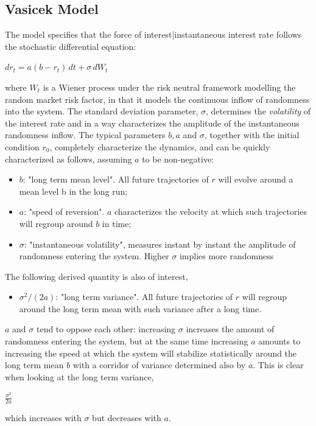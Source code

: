 \subsection{Vasicek Model}
The model specifies that the force of interest|instantaneous interest rate follows 
the stochastic differential equation:

$dr_t = a(b-r_t)\, dt + \sigma \, dW_t$

where $W_{t}$ is a Wiener process under the risk neutral framework modelling the random market risk factor,
 in that it models the continuous inflow of randomness into the system. The standard deviation parameter, $\sigma$, 
determines the \textit{volatility} of the interest rate and in a way characterizes the amplitude of the 
instantaneous randomness inflow. The typical parameters $b, a$ and  $\sigma$,
 together with the initial condition $r_0$, completely characterize the dynamics,
 and can be quickly characterized as follows, assuming $a$ to be non-negative: 
\begin{itemize}
\item $b$: "long term mean level". All future trajectories of $r$ will evolve around a mean level b in the long run;
\item $a$: "speed of reversion". $a$ characterizes the velocity at which such trajectories will regroup around
 $b$ in time;
\item $\sigma$: "instantaneous volatility", measures instant by instant the 
amplitude of randomness entering the system. Higher $\sigma$ implies more randomness
\end{itemize}

The following derived quantity is also of interest,
\begin{itemize}
\item ${\sigma^2}/(2 a)$: "long term variance". All future trajectories of $r$ will 
regroup around the long term mean with such variance after a long time. 
\end{itemize}
$a$ and $\sigma$ tend to oppose each other: increasing $\sigma$
 increases the amount of randomness entering the system,
 but at the same time increasing $a$ amounts to increasing the speed at which the system will 
stabilize statistically around the long term mean $b$ with a corridor of variance determined also by $a$. 
This is clear when looking at the long term variance,

$\frac{\sigma^2}{2 a}$

which increases with $\sigma$ but decreases with $a$.

